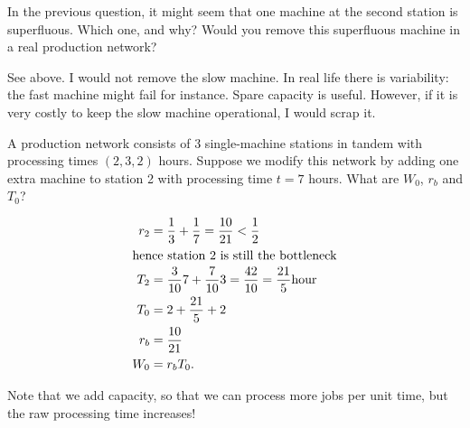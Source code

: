 \begin{question}
  In the previous question, it might seem that one machine at the
  second station is superfluous. Which one, and why? Would you remove
  this superfluous machine in a real production network?
\begin{solution}
  See above. I would not remove the slow machine. In real life there
  is variability: the fast machine might fail for instance. Spare
  capacity is useful. However, if it is very costly to keep the slow
  machine operational, I would scrap it.
\end{solution}
\end{question}



\begin{question}
  A production network consists of 3 single-machine stations in tandem
  with processing times $(2, 3, 2)$ hours.  Suppose we modify this
  network by adding one extra machine to station 2 with processing
  time $t=7$ hours.  What are $W_0$, $r_b$ and $T_0$?
\end{question}
\begin{solution}
  \begin{align*}
  r_2 &= \frac13 + \frac17 = \frac{10}{21} < \frac12\\
\intertext{hence station 2 is still the bottleneck}
T_2 &= \frac{3}{10}7 + \frac{7}{10}3 = \frac{42}{10}=\frac{21}{5}\text{hour}\\
T_0&=2+\frac{21}{5} +2\\
r_b &= \frac{10}{21}\\
W_0 &= r_b T_0.
   \end{align*}

   Note that we add capacity, so that we can process more jobs per
   unit time, but the raw processing time increases!
\end{solution}


